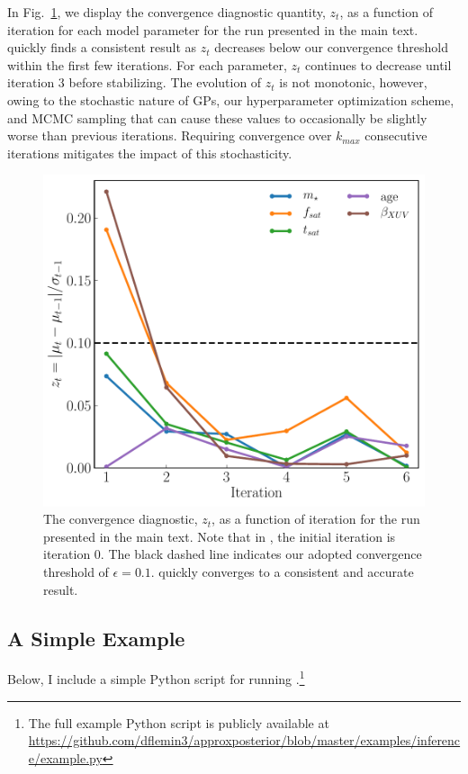 In Fig.~\ref{AP:fig:convergence}, we display the convergence diagnostic quantity, $z_t$, as a function of iteration for each model parameter for the \approxposterior run presented in the main text. \approxposterior quickly finds a consistent result as $z_t$ decreases below our convergence threshold within the first few iterations. For each parameter, $z_t$ continues to decrease until iteration 3 before stabilizing. The evolution of $z_t$ is not monotonic, however, owing to the stochastic nature of GPs, our hyperparameter optimization scheme, and MCMC sampling that can cause these values to occasionally be slightly worse than previous iterations. Requiring convergence over $k_{max}$ consecutive iterations mitigates the impact of this stochasticity.

\begin{figure}
\centering
	\includegraphics[width=\textwidth]{convergence.pdf}
   \caption{The \approxposterior convergence diagnostic, $z_t$, as a function of iteration for the run presented in the main text. Note that in \approxposterior, the initial iteration is iteration 0. The black dashed line indicates our adopted convergence threshold of $\epsilon = 0.1$. \approxposterior quickly converges to a consistent and accurate result.}%
    \label{AP:fig:convergence}%
\end{figure}

\subsection{A Simple Example} \label{AP:sec:example}
Below, I include a simple Python script for running \approxposterior.\footnote{The full example Python script is publicly available at \href{https://github.com/dflemin3/approxposterior/blob/master/examples/inference/example.py}{https://github.com/dflemin3/approxposterior/blob/master/examples/inference/example.py}}


